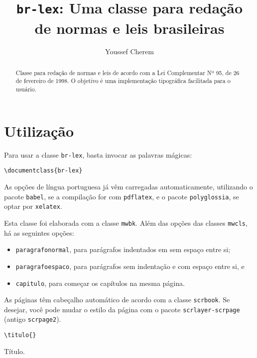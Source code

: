 \documentclass{ltxdoc}
\title{\texttt{br-lex}: Uma classe para redação\\ de normas e leis brasileiras}
\author{Youssef Cherem}
\newcommand{\nota}[1]{\marginpar{\hfill \cmd{#1}}}
\begin{document}
\maketitle

\begin{abstract}
Classe para redação de normas e leis de acordo com a Lei Complementar Nº 95, de 26 de fevereiro de 1998. O objetivo é uma implementação tipográfica facilitada para o usuário.
\end{abstract}

\section{Utilização}

Para usar a classe \texttt{br-lex}, basta invocar as palavras mágicas: 

\begin{verbatim}
\documentclass{br-lex}
\end{verbatim}

As opções de língua portuguesa já vêm carregadas automaticamente, utilizando o pacote \texttt{babel}, se a compilação for com \texttt{pdflatex}, e o pacote \texttt{polyglossia}, se optar por \texttt{xelatex}. 

Esta classe foi elaborada com a classe \texttt{mwbk}. Além das opções das classes \texttt{mwcls}, há as seguintes opções: 

\begin{itemize}

\item 
\texttt{paragrafonormal}, para parágrafos indentados em sem espaço entre si; 

\item
\texttt{paragrafoespaco}, para parágrafos sem indentação e com espaço entre si, e 

\item 
\texttt{capitulo}, para começar os capítulos na mesma página.

\end{itemize}

As páginas têm cabeçalho automático de acordo com a classe \texttt{scrbook}. Se desejar, você pode mudar o estilo da página com o pacote \texttt{scrlayer-scrpage} (antigo \texttt{scrpage2}).



\begin{verbatim}\titulo{}
\end{verbatim}
\nota{\titulo\marg{Título}} 
Título.
\end{document}
